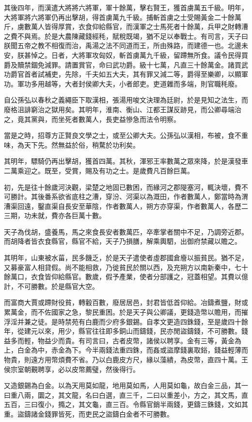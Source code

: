 其後四年，而漢遣大將將六將軍，軍十餘萬，擊右賢王，獲首虜萬五千級。明年，大將軍將六將軍仍再出擊胡，得首虜萬九千級。捕斬首虜之士受賜黃金二十餘萬斤，虜數萬人皆得厚賞，衣食仰給縣官，而漢軍之士馬死者十餘萬，兵甲之財轉漕之費不與焉。於是大農陳藏錢經秏，賦稅既竭，猶不足以奉戰士。有司言，天子曰朕聞五帝之教不相復而治，禹湯之法不同道而王，所由殊路，而建德一也。北邊未安，朕甚悼之。日者，大將軍攻匈奴，斬首虜萬九千級，留蹛無所食。議令民得買爵及贖禁錮免減罪。請置賞官，命曰武功爵。級十七萬，凡直三十餘萬金。諸買武功爵官首者試補吏，先除，千夫如五大夫，其有罪又減二等，爵得至樂卿，以顯軍功。軍功多用越等，大者封侯卿大夫，小者郎吏。吏道雜而多端，則官職秏廢。

自公孫弘以春秋之義繩臣下取漢相，張湯用唆文決理為廷尉，於是見知之法生，而廢格沮誹窮治之獄用矣。其明年，淮南、衡山、江都王謀反跡見，而公卿尋端治之，竟其黨與，而坐死者數萬人，長吏益慘急而法令明察。

當是之時，招尊方正賢良文學之士，或至公卿大夫。公孫弘以漢相，布被，食不重味，為天下先。然無益於俗，稍騖於功利矣。

其明年，驃騎仍再出擊胡，獲首四萬。其秋，渾邪王率數萬之眾來降，於是漢發車二萬乘迎之。既至，受賞，賜及有功之士。是歲費凡百餘巨萬。

初，先是往十餘歲河決觀，梁楚之地固已數困，而緣河之郡隄塞河，輒決壞，費不可勝計。其後番系欲省底柱之漕，穿汾、河渠以為溉田，作者數萬人，鄭當時為渭漕渠回遠，鑿直渠自長安至華陰，作者數萬人，朔方亦穿渠，作者數萬人，各歷二三期，功未就，費亦各巨萬十數。

天子為伐胡，盛養馬，馬之來食長安者數萬匹，卒牽掌者關中不足，乃調旁近郡。而胡降者皆衣食縣官，縣官不給，天子乃損膳，解乘輿駟，出御府禁藏以贍之。

其明年，山東被水菑，民多饑乏，於是天子遣使者虛郡國倉廥以振貧民。猶不足，又募豪富人相貸假。尚不能相救，乃徙貧民於關以西，及充朔方以南新秦中，七十餘萬口，衣食皆仰給縣官。數歲，假予產業，使者分部護之，冠蓋相望。其費以億計，不可勝數。於是縣官大空。

而富商大賈或蹛財役貧，轉轂百數，廢居居邑，封君皆低首仰給。冶鑄煮鹽，財或累萬金，而不佐國家之急，黎民重困。於是天子與公卿議，更錢造幣以贍用，而摧浮淫并兼之徒。是時禁苑有白鹿而少府多銀錫。自孝文更造四銖錢，至是歲四十餘年，從建元以來，用少，縣官往往即多銅山而鑄錢，民亦閒盜鑄錢，不可勝數。錢益多而輕，物益少而貴。有司言曰，古者皮幣，諸侯以聘享。金有三等，黃金為上，白金為中，赤金為下。今半兩錢法重四銖，而姦或盜摩錢裏取鋊，錢益輕薄而物貴，則遠方用幣煩費不省。乃以白鹿皮方尺，緣以藻繢，為皮幣，直四十萬。王侯宗室朝覲聘享，必以皮幣薦璧，然後得行。

又造銀錫為白金。以為天用莫如龍，地用莫如馬，人用莫如龜，故白金三品，其一曰重八兩，圜之，其文龍，名曰白選，直三千，二曰以重差小，方之，其文馬，直五百，三曰復小，撱之，其文龜，直三百。令縣官銷半兩錢，更鑄三銖錢，文如其重。盜鑄諸金錢罪皆死，而吏民之盜鑄白金者不可勝數。

